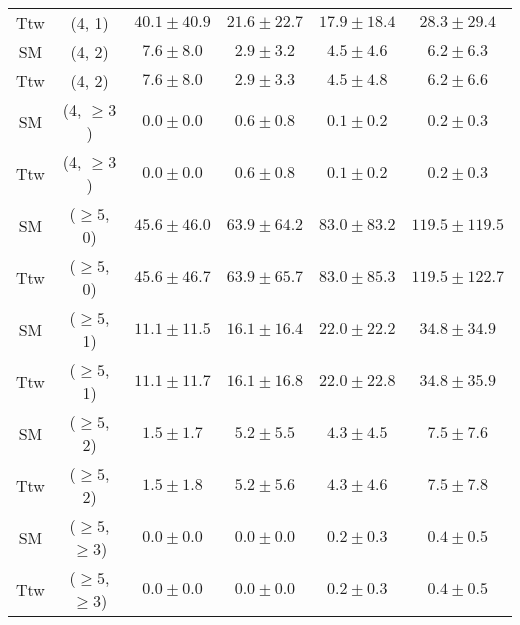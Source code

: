 \begin{table}[h!]
{\begin{tabular}{cccccc}
	Ttw & (4, 1) & $40.1\pm 40.9$ & $21.6\pm 22.7$ & $17.9\pm 18.4$ & $28.3\pm 29.4$ \\[0.5ex] 
	SM & (4, 2) & $7.6\pm 8.0$ & $2.9\pm 3.2$ & $4.5\pm 4.6$ & $6.2\pm 6.3$ \\[0.5ex] 
	Ttw & (4, 2) & $7.6\pm 8.0$ & $2.9\pm 3.3$ & $4.5\pm 4.8$ & $6.2\pm 6.6$ \\[0.5ex] 
	SM & (4, $\ge3$) & $0.0\pm 0.0$ & $0.6\pm 0.8$ & $0.1\pm 0.2$ & $0.2\pm 0.3$ \\[0.5ex] 
	Ttw & (4, $\ge3$) & $0.0\pm 0.0$ & $0.6\pm 0.8$ & $0.1\pm 0.2$ & $0.2\pm 0.3$ \\[0.5ex] 
	SM & ($\ge5$, 0) & $45.6\pm 46.0$ & $63.9\pm 64.2$ & $83.0\pm 83.2$ & $119.5\pm 119.5$ \\[0.5ex] 
	Ttw & ($\ge5$, 0) & $45.6\pm 46.7$ & $63.9\pm 65.7$ & $83.0\pm 85.3$ & $119.5\pm 122.7$ \\[0.5ex] 
	SM & ($\ge5$, 1) & $11.1\pm 11.5$ & $16.1\pm 16.4$ & $22.0\pm 22.2$ & $34.8\pm 34.9$ \\[0.5ex] 
	Ttw & ($\ge5$, 1) & $11.1\pm 11.7$ & $16.1\pm 16.8$ & $22.0\pm 22.8$ & $34.8\pm 35.9$ \\[0.5ex] 
	SM & ($\ge5$, 2) & $1.5\pm 1.7$ & $5.2\pm 5.5$ & $4.3\pm 4.5$ & $7.5\pm 7.6$ \\[0.5ex] 
	Ttw & ($\ge5$, 2) & $1.5\pm 1.8$ & $5.2\pm 5.6$ & $4.3\pm 4.6$ & $7.5\pm 7.8$ \\[0.5ex] 
	SM & ($\ge5$, $\ge3$) & $0.0\pm 0.0$ & $0.0\pm 0.0$ & $0.2\pm 0.3$ & $0.4\pm 0.5$ \\[0.5ex] 
	Ttw & ($\ge5$, $\ge3$) & $0.0\pm 0.0$ & $0.0\pm 0.0$ & $0.2\pm 0.3$ & $0.4\pm 0.5$ \\[0.5ex] 
	\hline
	\hline
\end{tabular}}
\end{table}

